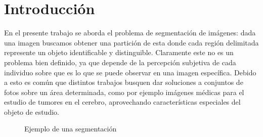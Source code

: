\section{Introducci\'on}

En el presente trabajo se aborda el problema de segmentaci\'on de im\'agenes: dada una imagen buscamos obtener una partici\'on de esta donde cada regi\'on delimitada represente un objeto identificable y distinguible. Claramente este no es un problema bien definido, ya que depende de la percepci\'on subjetiva de cada individuo sobre que es lo que se puede observar en una imagen espec\'ifica. Debido a esto es com\'un que distintos trabajos busquen dar soluciones a conjuntos de fotos sobre un área determinada, como por ejemplo im\'agenes m\'edicas para el estudio de tumores en el cerebro, aprovechando características especiales del objeto de estudio. \\

\begin{figure}[H]
	\begin{center}
	\end{center}
	\caption{Ejemplo de una segmentaci\'on}
	\label{ejemplo}
\end{figure} 

